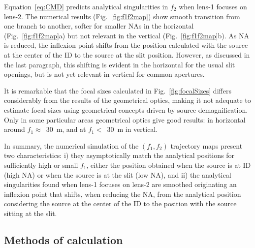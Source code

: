 \documentclass{iucr}              %
\begin{document}
Equation~\ref{eq:CMD} predicts analytical singularities in $f_2$ when lens-1 focuses on lens-2. The numerical results (Fig.~\ref{fig:f1f2map}) show smooth transition from one branch to another, softer for smaller NAs in the horizontal (Fig.~\ref{fig:f1f2map}a) but not relevant in the vertical (Fig.~\ref{fig:f1f2map}b). As NA is reduced, the inflexion point shifts from the position calculated with the source at the center of the ID to the source at the slit position. However, as discussed in the last paragraph, this shifting is evident in the horizontal for the usual slit openings, but is not yet relevant in vertical for common apertures. 

It is remarkable that the focal sizes calculated in Fig.~\ref{fig:focalSizes} differs considerably from the results of the geometrical optics, making it not adequate to estimate focal sizes using geometrical concepts driven by source demagnification. Only in some particular areas geometrical optics give good results: in horizontal around $f_1\approx$~\SI{30}{\meter}, and at  $f_1 <$~\SI{30}{\meter} in vertical. 

In summary, the numerical simulation of the $(f_1,f_2)$ trajectory maps present two characteristics: i) they asymptotically match the analytical positions for sufficiently high or small $f_1$, either the position obtained when the source is at ID (high NA) or when the source is at the slit (low NA), and ii) the analytical singularities found when lens-1 focuses on lens-2 are smoothed originating an inflexion point that shifts, when reducing the NA, from the analytical position considering the source at the center of the ID to the position with the source sitting at the slit.   
 

\subsection{Methods of calculation}
\end{document}
